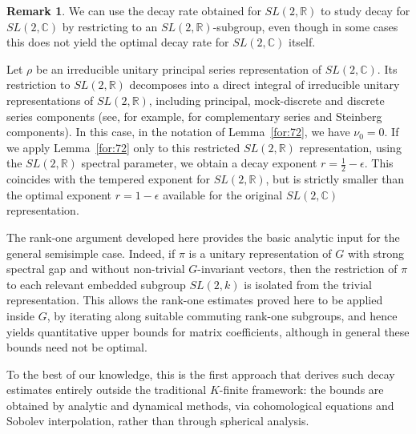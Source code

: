 \documentclass[11 pt]{amsart}
\newcommand{\RR}{\mathbb{R}}
\newcommand{\CC}{\mathbb{C}}
\theoremstyle{definition}
\newtheorem{remark}[theorem]{Remark}
\numberwithin{equation}{section}
\begin{document}
\begin{remark}\label{re:14} We can use the decay rate obtained for $SL(2,\RR)$ to study decay for $SL(2,\CC)$ by restricting to an $SL(2,\RR)$-subgroup, even though in some cases this does not yield the optimal decay rate for $SL(2,\CC)$ itself.

Let $\rho$ be an irreducible unitary principal series representation of
$SL(2,\CC)$. Its restriction to $SL(2,\RR)$ decomposes into a direct integral
of irreducible unitary representations of $SL(2,\RR)$, including principal,
mock-discrete and discrete series components (see, for example, \cite{BV} for
complementary series and Steinberg components). In this case, in the notation
of Lemma~\ref{for:72}, we have $\nu_0=0$. If we apply Lemma~\ref{for:72} only
to this restricted $SL(2,\RR)$ representation, using the $SL(2,\RR)$ spectral
parameter, we obtain a decay exponent $r = \tfrac{1}{2} - \epsilon.$ This coincides with the tempered exponent for $SL(2,\RR)$, but is strictly
smaller than the optimal exponent $r = 1 - \epsilon$ available for the
original $SL(2,\CC)$ representation.

The rank-one argument developed here provides the basic analytic input for the general semisimple case. Indeed, if \(\pi\) is a unitary representation of \(G\) with strong spectral gap and without non-trivial \(G\)-invariant vectors, then the restriction of \(\pi\) to each relevant embedded subgroup \(SL(2,k)\) is isolated from the trivial representation. This allows the rank-one estimates proved here to be applied inside \(G\), by iterating along suitable commuting rank-one subgroups, and hence yields quantitative upper bounds for matrix coefficients, although in general these bounds need not be optimal.

To the best of our knowledge, this is the first approach that derives such decay estimates entirely outside the traditional \(K\)-finite framework: the bounds are obtained by analytic and dynamical methods, via cohomological equations and Sobolev interpolation, rather than through spherical analysis.



\end{remark}
\end{document}
